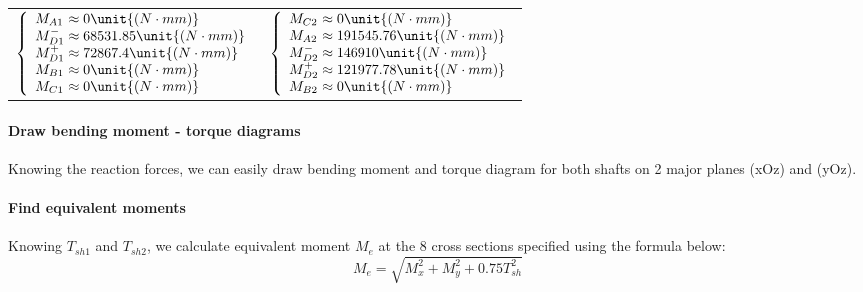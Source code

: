 {\centering
	\begin{tabular}[ht]{p{7cm}p{7cm}}
		$
		\left\{ 
		\begin{array}{l@{{} \approx {}}l}
		M_{A1} & 0 \unit{(N\cdot mm)}\\
		M_{D1}^- & 68531.85 \unit{(N\cdot mm)}\\
		M_{D1}^+ & 72867.4 \unit{(N\cdot mm)}\\
		M_{B1} & 0 \unit{(N\cdot mm)}\\
		M_{C1} & 0 \unit{(N\cdot mm)}\\
		\end{array}
		\right.
		$ &
		$
		\left\{ 
		\begin{array}{l@{{} \approx {}}l}
		M_{C2} & 0 \unit{(N\cdot mm)}\\
		M_{A2} & 191545.76 \unit{(N\cdot mm)}\\
		M_{D2}^- & 146910 \unit{(N\cdot mm)}\\
		M_{D2}^+ & 121977.78 \unit{(N\cdot mm)}\\
		M_{B2} & 0 \unit{(N\cdot mm)}\\
		\end{array}
		\right.
		$
\end{tabular}}\vskip2mm

\paragraph{Draw bending moment - torque diagrams} Knowing the reaction forces, we can easily draw bending moment and torque diagram for both shafts on 2 major planes (xOz) and (yOz).



\paragraph{Find equivalent moments} Knowing $ T_{sh1} $ and $ T_{sh2} $, we calculate equivalent moment $ M_e $ at the 8 cross sections specified using the formula below:
\[M_e = \sqrt{M_x^2 + M_y^2 + 0.75T_{sh}^2}\]

